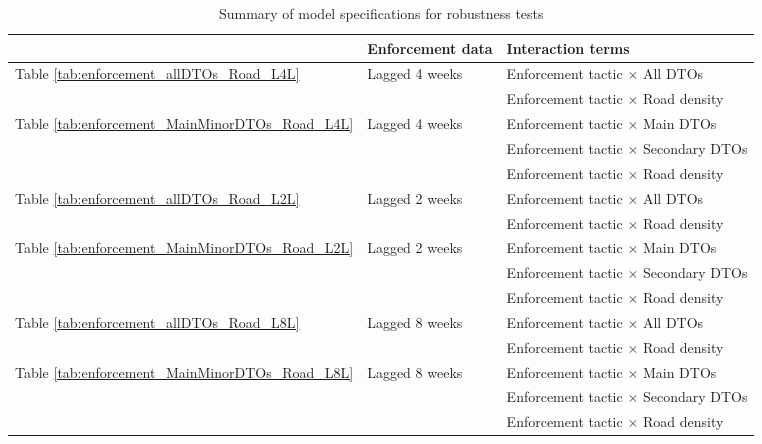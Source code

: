 \documentclass[12pt,letterpaper]{article}
\begin{document}
\begin{table}[h!]
\small
    \caption{Summary of model specifications for robustness tests}
    \label{tab:summary_robustness}
\begin{spacing}{0.95}
    \centering
    \begin{tabular}{lll}
    \hline
	&	Enforcement data	&	Interaction terms	\\	\hline	\hline
							
\multirow{2}{*}{Table \ref{tab:enforcement_allDTOs_Road_L4L}}	&	\multirow{2}{*}{Lagged 4 weeks}	&	Enforcement tactic $\times$ All DTOs	\\		
	&		&	Enforcement tactic $\times$ Road density 	\\	\hline	
							
\multirow{3}{*}{Table \ref{tab:enforcement_MainMinorDTOs_Road_L4L}}	&	\multirow{3}{*}{Lagged 4 weeks}	&	Enforcement tactic $\times$ Main DTOs	\\		
	&		&	Enforcement tactic $\times$ Secondary DTOs	\\		
	&		&	Enforcement tactic $\times$ Road density 	\\	\hline	
							
\multirow{2}{*}{Table \ref{tab:enforcement_allDTOs_Road_L2L}}	&	\multirow{2}{*}{Lagged 2 weeks}	&	Enforcement tactic $\times$ All DTOs	\\		
	&		&	Enforcement tactic $\times$ Road density 	\\	\hline	
							
\multirow{3}{*}{Table \ref{tab:enforcement_MainMinorDTOs_Road_L2L}}	&	\multirow{3}{*}{Lagged 2 weeks}	&	Enforcement tactic $\times$ Main DTOs	\\		
	&		&	Enforcement tactic $\times$ Secondary DTOs	\\		
	&		&	Enforcement tactic $\times$ Road density 	\\	\hline	
							
\multirow{2}{*}{Table \ref{tab:enforcement_allDTOs_Road_L8L}}	&	\multirow{2}{*}{Lagged 8 weeks}	&	Enforcement tactic $\times$ All DTOs	\\		
	&		&	Enforcement tactic $\times$ Road density 	\\	\hline	
							
\multirow{3}{*}{Table \ref{tab:enforcement_MainMinorDTOs_Road_L8L}}	&	\multirow{3}{*}{Lagged 8 weeks}	&	Enforcement tactic $\times$ Main DTOs	\\		
	&		&	Enforcement tactic $\times$ Secondary DTOs	\\		
	&		&	Enforcement tactic $\times$ Road density 	\\	\hline	

		
\hline
\end{tabular}
\end{spacing}
\end{table}
\end{document}
